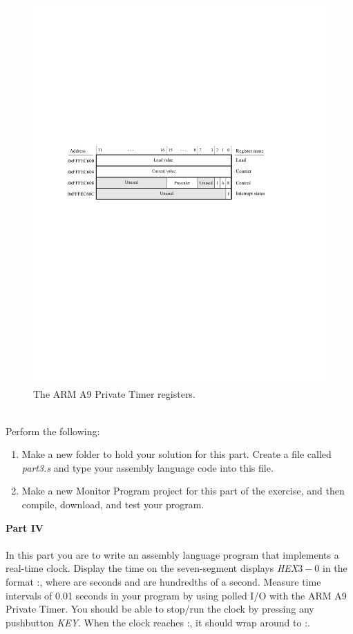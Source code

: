 \documentclass[epsfig,10pt,fullpage]{article}
\begin{document}
\begin{figure}[htb]
	\begin{center}
	\includegraphics[scale=1]{figures/figuretimer.pdf}
	\end{center}
	\caption{The ARM A9 Private Timer registers.}
\label{fig:timer}
\end{figure}

~\\
\noindent
Perform the following:

\begin{enumerate}
\item
Make a new folder to hold your solution for this part. Create a file called {\it part3.s} and 
type your assembly language code into this file.  
\item Make a new Monitor Program project for this 
part of the exercise, and then compile, download, and test your program. 
\end{enumerate}

\newpage
\noindent
{\bf Part IV}
~\\
~\\
\noindent
In this part you are to write an assembly language program that implements a real-time clock. 
Display the time on the seven-segment displays {\it HEX}$3-0$ in the format 
:, where  are seconds and  are hundredths of a second.
Measure time intervals of 0.01 seconds in your program by using polled I/O with the ARM A9 
Private Timer.  You should be able to stop/run the clock by pressing any pushbutton {\it KEY}.
When the clock reaches :, it should wrap around to :.
\end{document}

